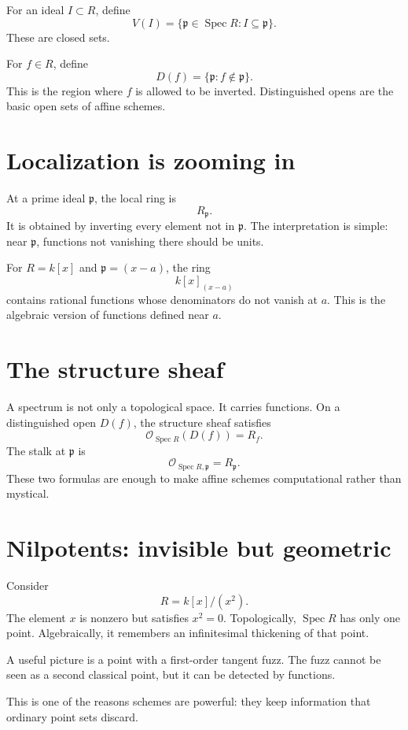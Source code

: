 For an ideal \(I\subset R\), define
\[
  V(I)=\{\mathfrak p\in\operatorname{Spec}R:I\subseteq\mathfrak p\}.
\]
These are closed sets.

For \(f\in R\), define
\[
  D(f)=\{\mathfrak p:f\notin\mathfrak p\}.
\]
This is the region where \(f\) is allowed to be inverted. Distinguished opens are the basic open sets of affine schemes.

\section{Localization is zooming in}

At a prime ideal \(\mathfrak p\), the local ring is
\[
  R_{\mathfrak p}.
\]
It is obtained by inverting every element not in \(\mathfrak p\). The interpretation is simple: near \(\mathfrak p\), functions not vanishing there should be units.

For \(R=k[x]\) and \(\mathfrak p=(x-a)\), the ring
\[
  k[x]_{(x-a)}
\]
contains rational functions whose denominators do not vanish at \(a\). This is the algebraic version of functions defined near \(a\).

\section{The structure sheaf}

A spectrum is not only a topological space. It carries functions. On a distinguished open \(D(f)\), the structure sheaf satisfies
\[
  \mathcal O_{\operatorname{Spec}R}(D(f))=R_f.
\]
The stalk at \(\mathfrak p\) is
\[
  \mathcal O_{\operatorname{Spec}R,\mathfrak p}=R_{\mathfrak p}.
\]
These two formulas are enough to make affine schemes computational rather than mystical.

\section{Nilpotents: invisible but geometric}

Consider
\[
  R=k[x]/(x^2).
\]
The element \(x\) is nonzero but satisfies \(x^2=0\). Topologically, \(\operatorname{Spec}R\) has only one point. Algebraically, it remembers an infinitesimal thickening of that point.

A useful picture is a point with a first-order tangent fuzz. The fuzz cannot be seen as a second classical point, but it can be detected by functions.

This is one of the reasons schemes are powerful: they keep information that ordinary point sets discard.

